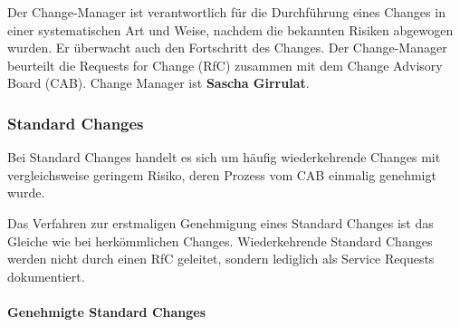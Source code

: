 \documentclass[]{article}
\let\oldparagraph\paragraph
\renewcommand{\paragraph}[1]{\oldparagraph{#1}\mbox{}}
\begin{document}
Der Change-Manager ist verantwortlich für die Durchführung eines Changes
in einer systematischen Art und Weise, nachdem die bekannten Risiken
abgewogen wurden. Er überwacht auch den Fortschritt des Changes. Der
Change-Manager beurteilt die Requests for Change (RfC) zusammen mit dem
Change Advisory Board (CAB). Change Manager ist \textbf{Sascha
Girrulat}.

\subsubsection{Standard Changes}\label{standard-changes}

Bei Standard Changes handelt es sich um häufig wiederkehrende Changes
mit vergleichsweise geringem Risiko, deren Prozess vom CAB einmalig
genehmigt wurde.

Das Verfahren zur erstmaligen Genehmigung eines Standard Changes ist das
Gleiche wie bei herkömmlichen Changes. Wiederkehrende Standard Changes
werden nicht durch einen RfC geleitet, sondern lediglich als Service
Requests dokumentiert.

\paragraph{Genehmigte Standard Changes}\label{genehmigte-standard-changes}
\end{document}
